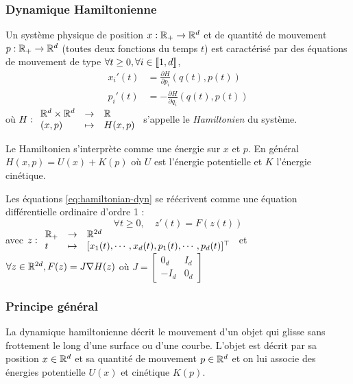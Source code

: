 \documentclass[10pt,a4paper]{article}
\begin{document}
\subsubsection{Dynamique Hamiltonienne}
Un système physique de position $x : \mathbb{R}_+ \to \mathbb{R}^d$ et de quantité de mouvement $p : \mathbb{R}_+ \to \mathbb{R}^d$ (toutes deux fonctions du temps $t$) est caractérisé par des équations de mouvement de type $\forall t \geq 0, \forall i \in {\left\llbracket 1,d \right\rrbracket}$, 
\begin{equation}\label{eq:hamiltonian-dyn}
  \begin{aligned}
     x_i'(t) &= \frac{\partial H}{\partial p_i} (q(t), p(t)) \\
     p_i' (t) &= -\frac{\partial H}{\partial q_i} (q(t), p(t))
  \end{aligned}
\end{equation}
où $H : { \begin{array}{lcl} \mathbb{R}^d \times \mathbb{R}^d & \to & \mathbb{R} \\ (x,p) & \mapsto & H(x,p) \end{array} }$ s'appelle le {\it Hamiltonien} du système.

Le Hamiltonien s'interprète comme une énergie sur $x$ et $p$. En général $H(x,p) = U(x) + K(p)$ où $U$ est l'énergie potentielle et $K$ l'énergie cinétique.

\begin{Rque}\label{rque:edo}
  Les équations \eqref{eq:hamiltonian-dyn} se réécrivent comme une équation différentielle ordinaire d'ordre 1 :
  \begin{equation}\label{eq:edo}
    \forall t \geq 0, \quad z'(t) = F(z(t))
    \tag{EDO}
  \end{equation}
  avec $z : { \begin{array}{lcl}  \mathbb{R}_+ & \to & \mathbb{R}^{2d} \\ t & \mapsto & [x_1(t), \cdots, x_d(t), p_1(t), \cdots, p_d(t)]^\top \end{array} }$ et $\forall z \in \mathbb{R}^{2d}, F(z) = J \nabla H (z)$ où
  $J = \begin{bmatrix}
    0_{d} & I_{d} \\
    -I_{d} & 0_{d}
  \end{bmatrix}$
\end{Rque}

\subsubsection{Principe général}
La dynamique hamiltonienne décrit le mouvement d'un objet qui glisse sans frottement le long d'une surface ou d'une courbe. L'objet est décrit par sa position $x \in \mathbb{R}^d$ et sa quantité de mouvement $p \in \mathbb{R}^d$ et on lui associe des énergies potentielle $U(x)$ et cinétique $K(p)$.
\end{document}
